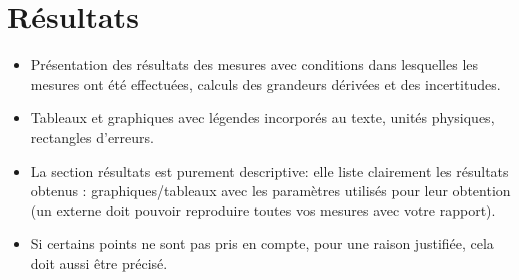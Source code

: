 \section{Résultats}

\begin{itemize}
\item Présentation des résultats des mesures avec conditions dans lesquelles les mesures ont été effectuées, calculs des grandeurs dérivées et des incertitudes.
\item Tableaux et graphiques avec légendes incorporés au texte, unités physiques, rectangles d'erreurs.
\item La section résultats est purement descriptive: elle liste clairement les résultats obtenus : graphiques/tableaux avec les paramètres utilisés pour leur obtention (un externe doit pouvoir reproduire toutes vos mesures avec votre rapport).
\item Si certains points ne sont pas pris en compte, pour une raison justifiée, cela doit aussi être précisé.
\end{itemize}